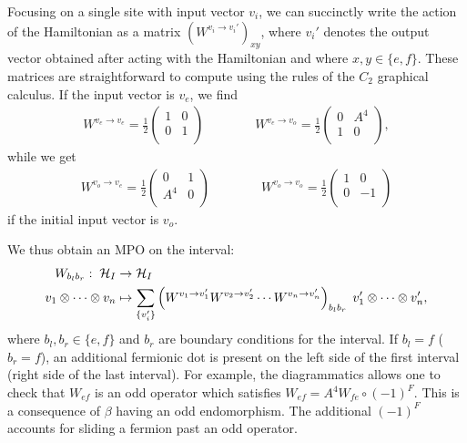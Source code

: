 Focusing on a single site with input vector $v_i$, 
we can succinctly write the action of the Hamiltonian as a matrix $(W^{v_i \to v_i'})_{xy}$, where $v_i'$ denotes the output vector obtained after acting with the Hamiltonian and where $x,y \in \{ e, f \}$.
These matrices are straightforward to compute using the rules of the $C_2$ graphical calculus.
If the input vector is $v_e$, we find
\begin{align}
W^{v_e \to v_e} = 
\frac{1}{2}\left( \begin{matrix} 
1 & 0\\
0 & 1 \\
\end{matrix} \right) \quad \quad \quad \quad 
W^{v_e \to v_o} = 
\frac{1}{2}\left( \begin{matrix} 
0& A^4\\
1 & 0 \\
\end{matrix} \right),
\end{align}
while we get
\begin{align}
W^{v_o \to v_e} = 
\frac{1}{2}\left( \begin{matrix} 
0 & 1\\
A^4 & 0\\
\end{matrix} \right) \quad \quad \quad \quad 
W^{v_o \to v_o} = 
\frac{1}{2}\left( \begin{matrix} 
1& 0\\
0 & -1 \\
\end{matrix} \right)
\end{align}
if the initial input vector is $v_o$.

We thus obtain an MPO on the interval:
\begin{align}
W_{b_l b_r}: \; \mathcal{H}_I &\to \mathcal{H}_I\\
v_1 \otimes \cdots \otimes v_n& \mapsto  \sum_{\{v_i' \}} \left( W^{v_1 \rightarrow v_1'} W^{v_2 \rightarrow v_2'} \cdots W^{v_n \rightarrow v_n'} \right)_{b_l b_r} \; v_1' \otimes \cdots \otimes v_n' ,
\end{align}
where $b_l,b_r \in \{e,f\}$ and $b_r$ are boundary conditions for the interval.
If $b_l=f$ ($b_r=f$), an additional fermionic dot is present on the left side of the first interval (right side of the last interval). 
For example, the diagrammatics allows one to check that $W_{ef}$ is an odd operator which satisfies $W_{ef} = A^4 W_{fe} \circ (-1)^F$.
This is a consequence of $\beta$ having an odd endomorphism.
The additional $(-1)^F$ accounts for sliding a fermion past an odd operator.

